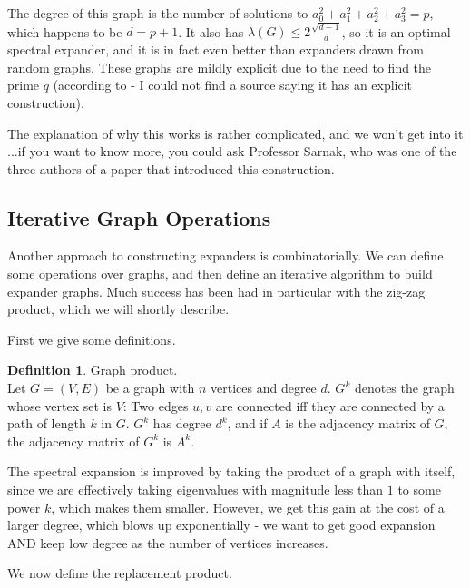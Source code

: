 \documentclass[11pt]{article}
\theoremstyle{definition}
\newtheorem{definition}[theorem]{Definition}
\theoremstyle{definition}
\theoremstyle{definition}
\begin{document}
The degree of this graph is the number of solutions to $a_0^2 + a_1^2 + a_2^2 + a_3^2 = p$, which happens to be $d = p + 1$. It also has $\lambda(G) \leq 2\frac{\sqrt{d - 1}}{d}$, so it is an optimal spectral expander, and it is in fact even better than expanders drawn from random graphs. These graphs are mildly explicit due to the need to find the prime $q$ (according to \cite{Vadhan} - I could not find a source saying it has an explicit construction). 

The explanation of why this works is rather complicated, and we won't get into it$...$if you want to know more, you could ask Professor Sarnak, who was one of the three authors of a paper that introduced this construction. 

\subsection{Iterative Graph Operations}

Another approach to constructing expanders is combinatorially. 
We can define some operations over graphs, and then define an iterative algorithm to build expander graphs. Much success has been had in particular with the zig-zag product, which we will shortly describe. 

First we give some definitions. 

\begin{definition} Graph product. \\
Let $G = (V, E)$ be a graph with $n$ vertices
and degree $d$. $G^k$ denotes the graph whose
vertex set is $V$: Two edges $u, v$ are connected
iff they are connected by a path of length $k$ in $G$.
$G^k$ has degree $d^k$, and if $A$ is the adjacency matrix
of $G$, the adjacency matrix of $G^k$ is $A^k$. 
\end{definition}

The spectral expansion is improved by taking the product of a graph
with itself, since we are effectively taking eigenvalues with magnitude
less than $1$ to some power $k$, which makes them smaller. However, we get
this gain at the cost of a larger degree, which blows up exponentially - we want
to get good expansion AND keep low degree as the number of vertices increases.

We now define the replacement product. 
\end{document}
